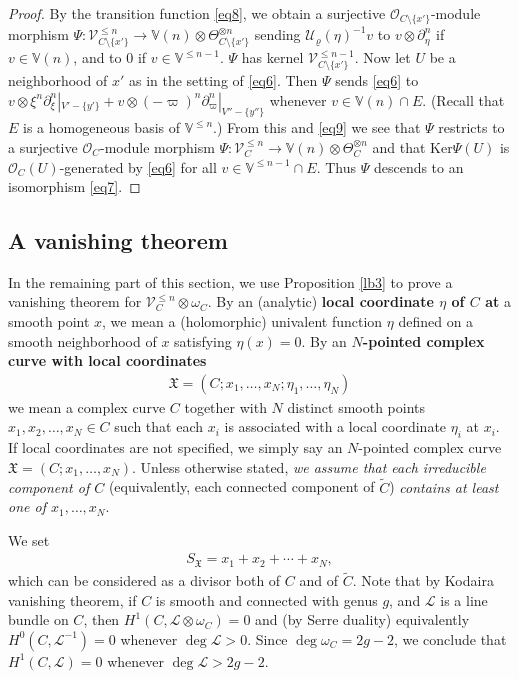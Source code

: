 \documentclass[12pt,a4paper,notitlepage]{article}
\theoremstyle{definition}
\theoremstyle{plain}
\newcommand{\fk}{\mathfrak}
\newcommand{\mc}{\mathcal}
\newcommand{\wtd}{\widetilde}
\newcommand{\scr}{\mathscr}
\newcommand{\SX}{S_{\fk X}}
\newcommand{\Vbb}{\mathbb V}
\newcommand{\Ker}{\mathrm{Ker}}
\numberwithin{equation}{section}
\begin{document}
\begin{proof}
By the transition function \eqref{eq8}, we obtain a surjective $\scr O_{C\setminus\{x'\}}$-module morphism $\Psi:\scr V_{C\setminus\{x'\}}^{\leq n}\rightarrow\Vbb(n)\otimes\Theta_{C\setminus\{x'\}}^{\otimes n}$ sending $\mc U_\varrho(\eta)^{-1}v$ to  $v\otimes \partial_\eta^n$ if $v\in\Vbb(n)$, and to $0$ if $v\in\Vbb^{\leq n-1}$. $\Psi$ has kernel $\scr V_{C\setminus\{x'\}}^{\leq n-1}$. Now let $U$ be a neighborhood of $x'$ as in the setting of \eqref{eq6}. Then $\Psi$ sends \eqref{eq6} to $v\otimes \xi^n\partial_\xi^n|_{V'-\{y'\}}+v\otimes(-\varpi)^n\partial_\varpi^n|_{V''-\{y''\}}$ whenever $v\in\Vbb(n)\cap E$. (Recall that $E$ is a homogeneous basis of $\Vbb^{\leq n}$.) From this and \eqref{eq9} we see that $\Psi$ restricts to a surjective $\scr O_C$-module morphism $\Psi:\scr V_C^{\leq n}\rightarrow\Vbb(n)\otimes\Theta_C^{\otimes n}$ and that $\Ker\Psi(U)$ is $\scr O_C(U)$-generated by  \eqref{eq6} for all $v\in \Vbb^{\leq n-1}\cap E$. Thus $\Psi$ descends to an isomorphism \eqref{eq7}.
\end{proof}


\subsection*{A vanishing theorem}



In the remaining part of this section, we use Proposition \ref{lb3} to prove a vanishing theorem for $\scr V_C^{\leq n}\otimes\omega_C$. By an (analytic) \textbf{local coordinate $\eta$ of $C$ at} a smooth point $x$, we mean  a (holomorphic) univalent function $\eta$ defined on a smooth neighborhood of $x$ satisfying $\eta(x)=0$. By an \textbf{$N$-pointed complex curve with local coordinates}
\begin{align*}
\fk X=(C;x_1,\dots,x_N;\eta_1,\dots,\eta_N)
\end{align*}
we mean a complex curve $C$ together with $N$ distinct smooth points $x_1,x_2,\dots,x_N\in C$ such that each $x_i$ is associated with a local coordinate $\eta_i$ at $x_i$. If local coordinates are not specified, we simply say an $N$-pointed complex curve $\fk X=(C;x_1,\dots,x_N)$. Unless otherwise stated, \emph{we assume that each irreducible component of $C$} (equivalently, each connected component of $\wtd C$) \emph{contains at least one of $x_1,\dots,x_N$}. 

We set \index{SX@$\SX,\SX(b)$}
\begin{align*}
\SX=x_1+x_2+\cdots+x_N,
\end{align*}
which can be considered as a divisor both of $C$ and of $\wtd C$. Note that by Kodaira vanishing theorem, if $C$ is smooth and connected with genus $g$, and $\scr L$ is a line bundle on $C$, then $H^1(C,\scr L\otimes\omega_C)=0$ and (by Serre duality) equivalently  $H^0(C,\scr L^{-1})=0$ whenever $\deg\scr L>0$. Since $\deg\omega_C=2g-2$, we conclude that $H^1(C,\scr L)=0$ whenever $\deg\scr L>2g-2$.
\end{document}

